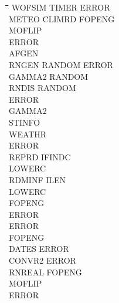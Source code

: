 \documentclass[11pt]{article}
\begin{document}
\begin{tabbing}
\hspace{1.27cm}\=\hspace{1.27cm}\=\hspace{1.27cm}\=\hspace{1.27cm}\=%
\hspace{1.27cm}\=\hspace{1.27cm}\=\hspace{1.27cm}\=\hspace{1.27cm}\=%
\hspace{1.27cm}\=\hspace{1.27cm}\=\kill
\>\> \> \> WOFSIM\> \> TIMER\> \> ERROR\\
\>\> \> \> \> \> METEO\> \> CLIMRD\> FOPENG\\
\>\> \> \> \> \> \> \> \> MOFLIP\\
\>\> \> \> \> \> \> \> \> ERROR\\
\>\> \> \> \> \> \> \> \> AFGEN\\
\>\> \> \> \> \> \> \> \> RNGEN \> RANDOM ERROR\\
\>\> \> \> \> \> \> \> \> \> GAMMA2 RANDOM\\
\>\> \> \> \> \> \> \> \> RNDIS\> RANDOM\\
\>\> \> \> \> \> \> \> \> \> ERROR\\
\>\> \> \> \> \> \> \> \> \> GAMMA2\\
\>\> \> \> \> \> \> \> STINFO\\
\>\> \> \> \> \> \> \> WEATHR\\
\>\> \> \> \> \> \> \> ERROR\\
\>\> \> \> \> \> \> \> REPRD\> IFINDC\\
\>\> \> \> \> \> \> \> \> LOWERC\\
\>\> \> \> \> \> \> \> \> RDMINF\> ILEN\\
\>\> \> \> \> \> \> \> \> \> LOWERC\\
\>\> \> \> \> \> \> \> \> \> FOPENG\\
\>\> \> \> \> \> \> \> \> \> ERROR\\
\>\> \> \> \> \> \> \> \> ERROR\\
\>\> \> \> \> \> \> \> \> FOPENG\\
\>\> \> \> \> \> \> \> \> DATES\> ERROR\\
\>\> \> \> \> \> \> \> \> CONVR2\> ERROR\\
\>\> \> \> \> \> \> \> RNREAL\> FOPENG\\
\>\> \> \> \> \> \> \> \> MOFLIP\\
\>\> \> \> \> \> \> \> \> ERROR\\

\end{tabbing}
\end{document}

